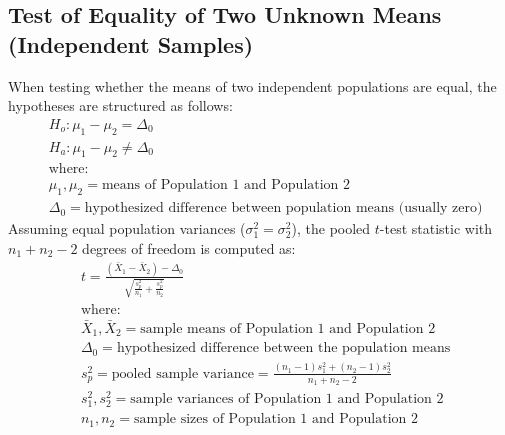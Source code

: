\subsection{Test of Equality of Two Unknown Means (Independent Samples)}
When testing whether the means of two independent populations are equal, the hypotheses are structured as follows:
\begin{align*}
	 & H_o: \mu_1 - \mu_2 = \Delta_0                                                 \\
	 & H_a: \mu_1 - \mu_2 \neq \Delta_0                                              \\
	 & \text{where:}                                                                 \\
	 & \mu_1, \mu_2 = \text{means of Population 1 and Population 2}                  \\
	 & \Delta_0 = \text{hypothesized difference between population means (usually zero)}
\end{align*}
Assuming equal population variances ($\sigma_1^2 = \sigma_2^2$), the pooled $t$-test statistic with $n_1 + n_2 - 2$ degrees of freedom is computed as:
\begin{align*}
	 & t = \frac{(\bar{X}_1 - \bar{X}_2) - \Delta_0}{\sqrt{\frac{s_p^2}{n_1} + \frac{s_p^2}{n_2}}} \\
	 & \text{where:}                                                                               \\
	 & \bar{X}_1, \bar{X}_2 = \text{sample means of Population 1 and Population 2}                 \\
	 & \Delta_0 = \text{hypothesized difference between the population means}                       \\
	 & s_p^2 = \text{pooled sample variance} = \frac{(n_1-1)s_1^2 + (n_2-1)s_2^2}{n_1+n_2-2}        \\
	 & s_1^2, s_2^2 = \text{sample variances of Population 1 and Population 2}                      \\
	 & n_1, n_2 = \text{sample sizes of Population 1 and Population 2}
\end{align*}
